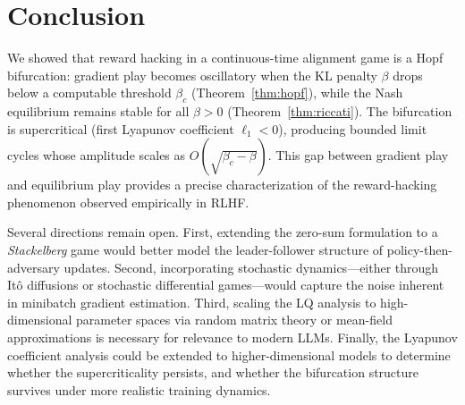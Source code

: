 \documentclass[10pt]{article}
\begin{document}
\section{Conclusion}
\label{sec:conclusion}

We showed that reward hacking in a continuous-time alignment game is a Hopf bifurcation: gradient play becomes oscillatory when the KL penalty $\beta$ drops below a computable threshold $\beta_c$ (Theorem~\ref{thm:hopf}), while the Nash equilibrium remains stable for all $\beta > 0$ (Theorem~\ref{thm:riccati}).
The bifurcation is supercritical (first Lyapunov coefficient $\ell_1 < 0$), producing bounded limit cycles whose amplitude scales as $O(\sqrt{\beta_c - \beta})$.
This gap between gradient play and equilibrium play provides a precise characterization of the reward-hacking phenomenon observed empirically in RLHF.

Several directions remain open.
First, extending the zero-sum formulation to a \emph{Stackelberg} game would better model the leader-follower structure of policy-then-adversary updates.
Second, incorporating stochastic dynamics---either through It\^o diffusions or stochastic differential games---would capture the noise inherent in minibatch gradient estimation.
Third, scaling the LQ analysis to high-dimensional parameter spaces via random matrix theory or mean-field approximations is necessary for relevance to modern LLMs.
Finally, the Lyapunov coefficient analysis could be extended to higher-dimensional models to determine whether the supercriticality persists, and whether the bifurcation structure survives under more realistic training dynamics.


\end{document}
